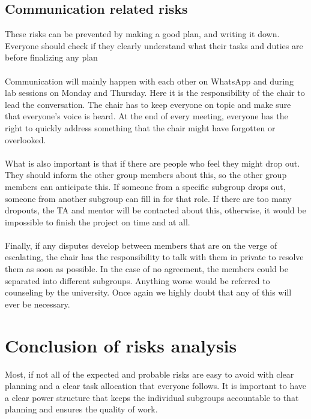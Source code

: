 \subsection{Communication related risks}
These risks can be prevented by making a good plan, and writing it down. Everyone should check if they clearly understand what their tasks and duties are before finalizing any plan\\\\ Communication will mainly happen with each other on WhatsApp and during lab sessions on Monday and Thursday. Here it is the responsibility of the chair to lead the conversation. The chair has to keep everyone on topic and make sure that everyone's voice is heard. At the end of every meeting, everyone has the right to quickly address something that the chair might have forgotten or overlooked.\\\\ What is also important is that if there are people who feel they might drop out. They should inform the other group members about this, so the other group members can anticipate this. If someone from a specific subgroup drops out, someone from another subgroup can fill in for that role. If there are too many dropouts, the TA and mentor will be contacted about this, otherwise, it would be impossible to finish the project on time and at all.\\\\ Finally, if any disputes develop between members that are on the verge of escalating, the chair has the responsibility to talk with them in private to resolve them as soon as possible. In the case of no agreement, the members could be separated into different subgroups. Anything worse would be referred to counseling by the university. Once again we highly doubt that any of this will ever be necessary.\\

\section{Conclusion of risks analysis}
Most, if not all of the expected and probable risks are easy to avoid with clear planning and a clear task allocation that everyone follows. It is important to have a clear power structure that keeps the individual subgroups accountable to that planning and ensures the quality of work.  